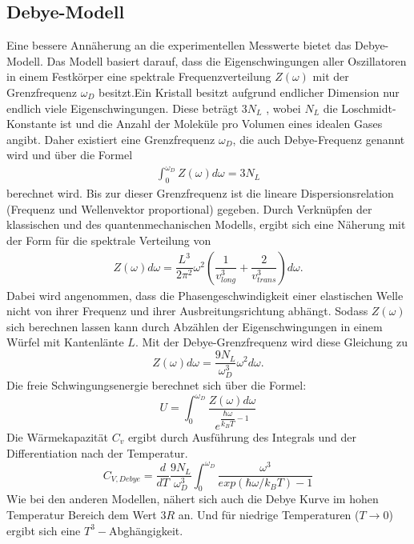 \subsection{Debye-Modell}
Eine bessere Annäherung an die  experimentellen Messwerte bietet das Debye-Modell.
Das Modell basiert darauf, dass die Eigenschwingungen aller Oszillatoren in einem Festkörper eine spektrale Frequenzverteilung $Z(\omega)$ mit der  Grenzfrequenz $\omega_D$ besitzt.Ein Kristall besitzt aufgrund endlicher Dimension nur endlich viele Eigenschwingungen. Diese beträgt $ 3 N_L$ , wobei $N_L$ die Loschmidt-Konstante ist und die Anzahl der Moleküle pro Volumen eines idealen Gases angibt. Daher existiert eine Grenzfrequenz $\omega_D$, die auch Debye-Frequenz genannt wird und über die Formel 
\begin{align}
\int_{0}^{\omega_D}Z(\omega)d\omega=3N_L
\end{align}
berechnet wird. Bis zur dieser Grenzfrequenz ist die lineare Dispersionsrelation (Frequenz und Wellenvektor proportional) gegeben. Durch Verknüpfen der klassischen und des quantenmechanischen Modells, ergibt sich eine Näherung mit der Form für die spektrale Verteilung von 
\begin{align}
Z(\omega)d\omega=\dfrac{L^3}{2\pi^2}\omega^2\left(\dfrac{1}{v_{long}^3}+\dfrac{2}{v_{trans}^3}\right)d\omega.
\end{align}
Dabei wird angenommen, dass die Phasengeschwindigkeit einer elastischen Welle nicht von ihrer Frequenz und ihrer Ausbreitungsrichtung abhängt. Sodass $Z(\omega)$ sich berechnen lassen kann durch Abzählen der Eigenschwingungen in einem Würfel mit Kantenlänte $L$. 
Mit der Debye-Grenzfrequenz wird diese Gleichung zu 
\begin{equation}
Z(\omega)d\omega=\dfrac{9N_L}{\omega_D^3}\omega^2 d\omega.
\end{equation}
Die freie Schwingungsenergie berechnet sich über die Formel:
\begin{equation}
U=\int_{0}^{\omega_D}\dfrac{Z(\omega)d\omega}{e^{\dfrac{\hbar \omega}{k_B T}-1}}
\end{equation}
Die Wärmekapazität $C_v$ ergibt durch Ausführung des Integrals und der Differentiation nach der Temperatur. 
\begin{equation}
C_{V,Debye}=\dfrac{d}{dT}\dfrac{9N_L}{\omega_D^3}\int_{0}^{\omega_D}\dfrac{\omega^3}{exp(\hbar\omega/k_BT)-1}
\end{equation}
Wie bei den anderen Modellen, nähert sich auch die Debye Kurve im hohen Temperatur Bereich dem Wert $3R$ an. Und für niedrige Temperaturen ($T\rightarrow 0$) ergibt sich eine $T^3-$Abghängigkeit. 

